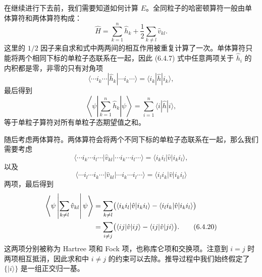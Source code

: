 在继续进行下去前，我们需要知道如何计算 $E$。全同粒子的哈密顿算符一般由单体算符和两体算符构成：
\begin{equation}
 \hat H=\sum_{k=1}^{n}\hat h_k+\frac12\sum_{k\ne l}\hat v_{kl}.
\tag{6.4.15}
\end{equation}
这里的 $1/2$ 因子来自求和式中两两间的相互作用被重复计算了一次。单体算符只能将两个相同下标的单粒子态联系在一起，因此 (6.4.7) 式中任意两项关于 $\hat h_i$ 的内积都是零，非零的只有对角项
\begin{equation}
 \langle\cdots i_k\cdots|\hat h_k|\cdots i_k\cdots\rangle=\langle i_k|\hat h|i_k\rangle,
\tag{6.4.16}
\end{equation}
最后得到
\begin{equation}
 \left\langle\psi\left|\sum_{k=1}^{n}\hat h_k\right|\psi\right\rangle=\sum_{i=1}^{n}\langle i|\hat h|i\rangle,
\tag{6.4.17}
\end{equation}
等于单粒子算符对所有单粒子态期望值之和。

随后考虑两体算符。两体算符会将两个不同下标的单粒子态联系在一起，那么我们需要考虑
\begin{equation}
 \langle\cdots i_k\cdots i_l\cdots|\hat v_{kl}|\cdots i_k\cdots i_l\cdots\rangle
 =\langle i_ki_l|\hat v|i_ki_l\rangle,
\tag{6.4.18}
\end{equation}
以及
\begin{equation}
 \langle\cdots i_l\cdots i_k\cdots|\hat v_{kl}|\cdots i_k\cdots i_l\cdots\rangle
 =\langle i_li_k|\hat v|i_ki_l\rangle
\tag{6.4.19}
\end{equation}
两项，最后得到
\begin{align}
 \left\langle\psi\left|\sum_{k\ne l}\hat v_{kl}\right|\psi\right\rangle
 &=\sum_{k\ne l}\bigl(\langle i_ki_l|\hat v|i_ki_l\rangle-\langle i_li_k|\hat v|i_ki_l\rangle\bigr)\notag\\
 &=\sum_{i\ne j}\bigl(\langle ij|\hat v|ij\rangle-\langle ij|\hat v|ji\rangle\bigr).
\tag{6.4.20}
\end{align}
这两项分别被称为 Hartree 项和 Fock 项，也称库仑项和交换项。注意到 $i=j$ 时两项相互抵消，因此求和中 $i\ne j$ 的约束可以去除。推导过程中我们始终假定了 $\{|i\rangle\}$ 是一组正交归一基。

